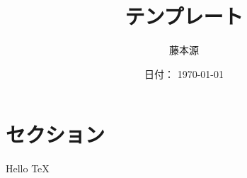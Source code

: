\documentclass{ltjsarticle}
\title{テンプレート}
\author{藤本源}
\date{日付： \today}
\begin{document}
\maketitle

\section{セクション}

Hello \TeX
\end{document}
